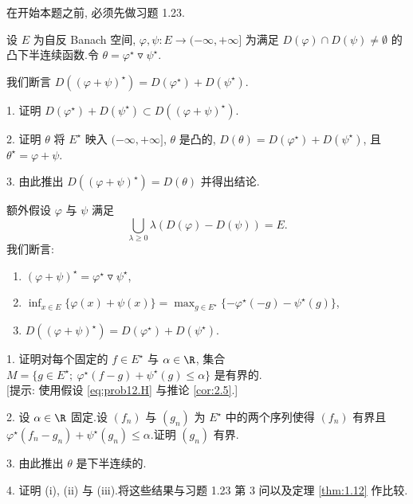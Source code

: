 \begin{problem}[第 1, 2, 3 章]
\label{prob:12}
在开始本题之前, 必须先做习题 1.23.

设 $E$ 为自反 Banach 空间, $\varphi,\psi:E\to(-\infty,+\infty]$ 为满足
$D(\varphi)\cap D(\psi)\ne\emptyset$ 的凸下半连续函数.令
$\theta=\varphi^\star\mathbin{\triangledown}\psi^\star$.


我们断言 $D((\varphi+\psi)^\star)=D(\varphi^\star)+D(\psi^\star)$.

1. 证明 $D(\varphi^\star)+D(\psi^\star)\subset D((\varphi+\psi)^\star)$.

2. 证明 $\theta$ 将 $E^\star$ 映入 $(-\infty,+\infty]$, $\theta$ 是凸的,
$D(\theta)=D(\varphi^\star)+D(\psi^\star)$, 且 $\theta^\star=\varphi+\psi$.

3. 由此推出 $D((\varphi+\psi)^\star)=D(\theta)$ 并得出结论.


额外假设 $\varphi$ 与 $\psi$ 满足
\begin{equation}
\bigcup_{\lambda\ge0}\lambda(D(\varphi)-D(\psi))=E.
\tag{H}
\label{eq:prob12.H}
\end{equation}
我们断言:
\begin{enumerate}[label=(\roman*), itemsep=0.1em]
	\item $(\varphi+\psi)^\star=\varphi^\star\mathbin{\triangledown}\psi^\star$,
	\item $\inf_{x\in E}\{\varphi(x)+\psi(x)\}=\max_{g\in E^\star}\{-\varphi^\star(-g)-\psi^\star(g)\}$,
	\item $D((\varphi+\psi)^\star)=D(\varphi^\star)+D(\psi^\star)$.
\end{enumerate}

1. 证明对每个固定的 $f\in E^\star$ 与 $\alpha\in\R$, 集合
$M=\{g\in E^\star;\ \varphi^\star(f-g)+\psi^\star(g)\le\alpha\}$ 是有界的.\\
{[提示: 使用假设 \eqref{eq:prob12.H} 与推论  \ref{cor:2.5}.]}

2. 设 $\alpha\in\R$ 固定.设 $(f_n)$ 与 $(g_n)$ 为 $E^\star$ 中的两个序列使得
$(f_n)$ 有界且 $\varphi^\star(f_n-g_n)+\psi^\star(g_n)\le\alpha$.证明 $(g_n)$ 有界.

3. 由此推出 $\theta$ 是下半连续的.

4. 证明 (i), (ii) 与 (iii).将这些结果与习题 1.23 第 3 问以及定理  \ref{thm:1.12} 作比较.
\end{problem}


